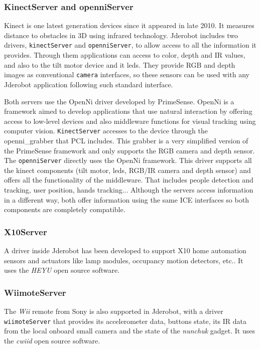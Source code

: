 \documentclass[twocolumn]{svjour3}          %
\begin{document}
\subsubsection{KinectServer and openniServer}

Kinect is one latest generation devices since it appeared in late 2010. It measures distance to obstacles in 3D using infrared technology. Jderobot includes two drivers, \texttt{kinectServer} and \texttt{openniServer}, to allow access to all the information it provides. Through them applications can access to color, depth and IR values, and also to the tilt motor device and it leds. They provide RGB and depth images as conventional \texttt{camera} interfaces, so these sensors can be used with any Jderobot application following such standard interface.

Both servers use the OpenNi driver developed by PrimeSense. OpenNi is a framework aimed to develop applications that use natural interaction by offering access to low-level devices and also middleware functions for visual tracking using computer vision. \texttt{KinectServer} accesses to the device through the openni\_grabber that PCL includes. This grabber is a very simplified version of the PrimeSense framework and only supports the RGB camera and depth sensor. The \texttt{openniServer} directly uses the OpenNi framework. This driver supports all the kinect components (tilt motor, leds, RGB/IR camera and depth sensor) and offers all the functionality of the middleware. That includes people detection and tracking, user position, hands tracking... Although the servers access information in a different way, both offer information using the same ICE interfaces so both components are completely compatible. 

\subsubsection{X10Server}

A driver inside Jderobot has been developed to support X10 home automation sensors and actuators like lamp modules, occupancy motion detectors, etc.. It uses the \textit{HEYU} open source software. 

\subsubsection{WiimoteServer}

The \textit{Wii} remote from Sony is also supported in Jderobot, with a driver \texttt{wiimoteServer} that provides its accelerometer data, buttons state, its IR data from the local onboard small camera and the state of the \textit{nunchuk} gadget. It uses the \textit{cwiid} open source software.
\end{document}
